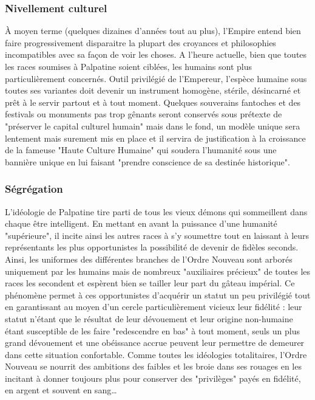 \documentclass[twoside]{article}
\begin{document}
\subsubsection{Nivellement culturel}
À moyen terme (quelques dizaines d'années tout au plus), l'Empire entend bien faire progressivement disparaitre la plupart des croyances et philosophies incompatibles avec sa façon de voir les choses. A l'heure actuelle, bien que toutes les races soumises à Palpatine soient ciblées, les humains sont plus particulièrement concernés. Outil privilégié de l'Empereur, l'espèce humaine sous toutes ses variantes doit devenir un instrument homogène, stérile, désincarné et prêt à le servir partout et à tout moment. Quelques souverains fantoches et des festivals ou monuments pas trop gênants seront conservés sous prétexte de "préserver le capital culturel humain" mais dans le fond, un modèle unique sera lentement mais surement mis en place et il servira de justification à la croissance de la fameuse "Haute Culture Humaine" qui soudera l'humanité sous une bannière unique en lui faisant "prendre conscience de sa destinée historique".

\subsubsection{Ségrégation}
L'idéologie de Palpatine tire parti de tous les vieux démons qui sommeillent dans chaque être intelligent. En mettant en avant la puissance d'une humanité "supérieure", il incite ainsi les autres races à s'y soumettre tout en laissant à leurs représentants les plus opportunistes la possibilité de devenir de fidèles seconds. Ainsi, les uniformes des différentes branches de l'Ordre Nouveau sont arborés uniquement par les humains mais de nombreux "auxiliaires précieux" de toutes les races les secondent et espèrent bien se tailler leur part du gâteau impérial. Ce phénomène permet à ces opportunistes d'acquérir un statut un peu privilégié tout en garantissant au moyen d'un cercle particulièrement vicieux leur fidélité : leur statut n'étant que le résultat de leur dévouement et leur origine non-humaine étant susceptible de les faire "redescendre en bas" à tout moment, seuls un plus grand dévouement et une obéissance accrue peuvent leur permettre de demeurer dans cette situation confortable. Comme toutes les idéologies totalitaires, l'Ordre Nouveau se nourrit des ambitions des faibles et les broie dans ses rouages en les incitant à donner toujours plus pour conserver des "privilèges" payés en fidélité, en argent et souvent en sang\ldots\\
\end{document}
